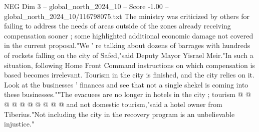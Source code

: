 \begin{textsample}{NEG Dim 3 – global\_north\_2024\_10 – Score -1.00 – global\_north\_2024\_10/116798075.txt}
The ministry was criticized by others for failing to address the needs of areas outside of the zones already receiving compensation sooner ; some highlighted additional economic damage not covered in the current proposal."We ' re talking about dozens of barrages with hundreds of rockets falling on the city of Safed,"said Deputy Mayor Yisrael Meir."In such a situation, following Home Front Command instructions on which compensation is based becomes irrelevant.
Tourism in the city is finished, and the city relies on it.
Look at the businesses ' finances and see that not a single shekel is coming into these businesses.""The evacuees are no longer in hotels in the city ; tourism @ @ @ @ @ @ @ @ @ @ and not domestic tourism,"said a hotel owner from Tiberius."Not including the city in the recovery program is an unbelievable injustice."

\end{textsample}
